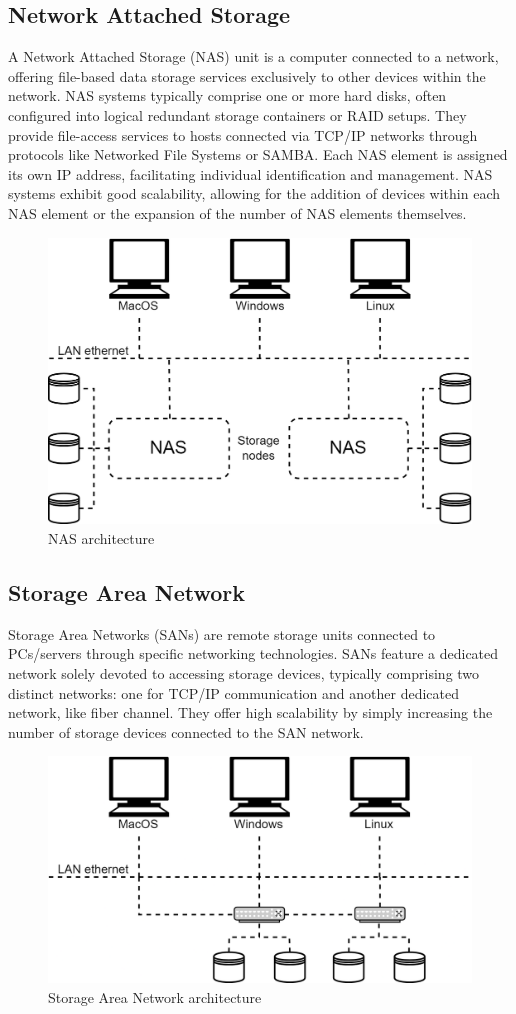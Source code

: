 \subsection{Network Attached Storage}
A Network Attached Storage (NAS) unit is a computer connected to a network, offering file-based data storage services exclusively to other devices within the network. 
NAS systems typically comprise one or more hard disks, often configured into logical redundant storage containers or RAID setups. 
They provide file-access services to hosts connected via TCP/IP networks through protocols like Networked File Systems or SAMBA. 
Each NAS element is assigned its own IP address, facilitating individual identification and management. 
NAS systems exhibit good scalability, allowing for the addition of devices within each NAS element or the expansion of the number of NAS elements themselves.
\begin{figure}[H]
    \centering
    \includegraphics[width=0.6\linewidth]{images/nas.png}
    \caption{NAS architecture}
\end{figure}

\subsection{Storage Area Network}
Storage Area Networks (SANs) are remote storage units connected to PCs/servers through specific networking technologies. 
SANs feature a dedicated network solely devoted to accessing storage devices, typically comprising two distinct networks: one for TCP/IP communication and another dedicated network, like fiber channel. 
They offer high scalability by simply increasing the number of storage devices connected to the SAN network.
\begin{figure}[H]
    \centering
    \includegraphics[width=0.6\linewidth]{images/san.png}
    \caption{Storage Area Network architecture}
\end{figure}

